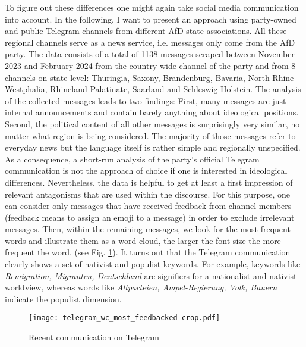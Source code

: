 \documentclass[a4paper]{scrreprt}
\begin{document}
To figure out these differences one might again take social media communication into account. In the following, I want to present an approach using party-owned and public Telegram channels from different AfD state associations. All these regional channels serve as a news service, i.e. messages only come from the AfD party. The data consists of a total of 1138 messages scraped between November 2023 and February 2024 from the country-wide channel of the party and from 8 channels on state-level: Thuringia, Saxony, Brandenburg, Bavaria, North Rhine-Westphalia, Rhineland-Palatinate, Saarland and Schleswig-Holstein. The analysis of the collected messages leads to two findings: First, many messages are just internal announcements and contain barely anything about ideological positions. Second, the political content of all other messages is surprisingly very similar, no matter what region is being considered. The majority of those messages refer to everyday news but the language itself is rather simple and regionally unspecified. As a consequence, a short-run analysis of the party's official Telegram communication is not the approach of choice if one is interested in ideological differences. Nevertheless, the data is helpful to get at least a first impression of relevant antagonisms that are used within the discourse. For this purpose, one can consider only messages that have received feedback from channel members (feedback means to assign an emoji to a message) in order to exclude irrelevant messages. Then, within the remaining messages, we look for the most frequent words and illustrate them as a word cloud, the larger the font size the more frequent the word. (see Fig. \ref{fig:fig1}). It turns out that the Telegram communication clearly shows a set of nativist and populist keywords. For example, keywords like {\em Remigration, Migranten, Deutschland} are signifiers for a nationalist and nativist worldview, whereas words like {\em Altparteien, Ampel-Regierung, Volk, Bauern} indicate the populist dimension.\par
\begin{figure}[ht]
    \centering
    \texttt{[image: telegram\_wc\_most\_feedbacked-crop.pdf]}
    \caption{Recent communication on Telegram}
    \label{fig:fig1}
\end{figure}
\end{document}
